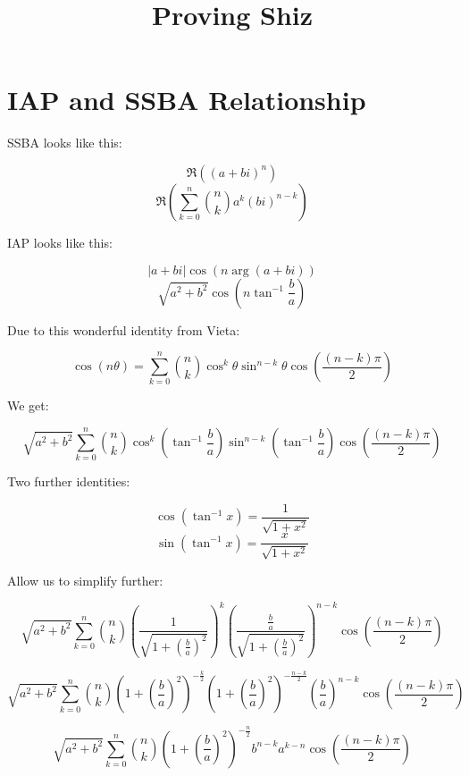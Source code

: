 \documentclass[a4paper]{article}
\title{Proving Shiz}
\author{}
\date{}
\begin{document}
\maketitle

\section{IAP and SSBA Relationship}
	SSBA looks like this:

	\[ \Re \left( (a + bi)^{n} \right) \]
	\[ \Re \left( \sum_{k=0}^{n} \binom{n}{k} a^{k} (bi)^{n-k} \right) \]

	IAP looks like this:

	\[ |a + bi|\cos(n\arg(a + bi)) \]
	\[ \sqrt{a^{2} + b^{2}} \cos \left( n\tan^{-1}\frac{b}{a} \right) \]

	Due to this wonderful identity from Vieta:

	\[ \cos(n\theta) = \sum_{k=0}^{n} \binom{n}{k} 
		                          \cos^{k}\theta 
					  \sin^{n-k}\theta 
					  \cos \left( \frac{(n-k)\pi}{2} \right) \]

	We get:

	\[ \sqrt{a^{2} + b^{2}} \sum_{k=0}^{n} \binom{n}{k}
		                               \cos^{k} \left( \tan^{-1}\frac{b}{a} \right)
	                                       \sin^{n-k} \left( \tan^{-1}\frac{b}{a} \right) 
					       \cos \left( \frac{(n-k)\pi}{2} \right) \]

	Two further identities:

	\[ \cos(\tan^{-1}x) = \frac{1}{\sqrt{1 + x^2}} \]
	\[ \sin(\tan^{-1}x) = \frac{x}{\sqrt{1 + x^2}} \]

	Allow us to simplify further:

	\[ \sqrt{a^{2} + b^{2}} \sum_{k=0}^{n} \binom{n}{k}
				   	       \left( \frac{1}{\sqrt{1 + \left( \frac{b}{a} \right)^{2}}} \right)^{k}
					       \left( \frac{\frac{b}{a}}{\sqrt{1 + \left( \frac{b}{a} \right)^{2}}}
					       		\right)^{n-k}
					       \cos \left( \frac{(n-k)\pi}{2} \right) \]

	\[ \sqrt{a^{2} + b^{2}} \sum_{k=0}^{n} \binom{n}{k}
					       \left( 1 + \left( \frac{b}{a} \right) ^{2} \right)^{-\frac{k}{2}}
					       \left( 1 + \left( \frac{b}{a} \right) ^{2} \right)^{-\frac{n-k}{2}}
					       \left( \frac{b}{a} \right)^{n-k}
					       \cos \left( \frac{(n-k)\pi}{2} \right) \]
	
	\[ \sqrt{a^{2} + b^{2}} \sum_{k=0}^{n} \binom{n}{k}
					       \left( 1 + \left( \frac{b}{a} \right) ^{2} \right)^{-\frac{n}{2}}
					       b^{n-k} a^{k-n}
					       \cos \left( \frac{(n-k)\pi}{2} \right) \]
\end{document}
